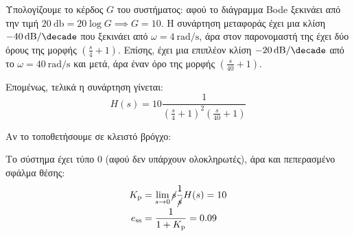 \documentclass[11pt,a4paper,notitlepage,fleqn]{article}
\begin{document}
\begin{exercise}
Υπολογίζουμε το κέρδος \( G \) του συστήματος: αφού το διάγραμμα Bode ξεκινάει από την τιμή
\( \SI{20}{\decibel} = 20\log G \implies G = 10 \). Η συνάρτηση μεταφοράς έχει μια κλίση
\( \SI{-40}{\decibel/\decade} \) που ξεκινάει από \( \omega = \SI{4}{\radian/\second} \),
άρα στον παρονομαστή της έχει δύο όρους της μορφής \( \left(\frac{s}{4}+1\right) \). Επίσης,
έχει μια επιπλέον κλίση \( \SI{-20}{\decibel/\decade} \) από το \( \omega = \SI{40}{\radian/\second} \) και μετά, άρα έναν όρο της μορφής \( \left(\frac{s}{40} + 1\right) \).

Επομένως, τελικά η συνάρτηση γίνεται:
\[
H(s) = 10 \frac{1}{\left(\frac{s}{4}+1\right)^2\left(\frac{s}{40}+1\right)}
\]

Αν το τοποθετήσουμε σε κλειστό βρόγχο:


Το σύστημα έχει τύπο 0 (αφού δεν υπάρχουν ολοκληρωτές), άρα και πεπερασμένο σφάλμα θέσης:
\begin{align*}
	K_{\mathrm{p}} &= \lim_{s\to 0} \cancel{s}\frac{1}{\cancel{s}}H(s) = 10 \\
	e_{\mathrm{ss}} &= \frac{1}{1+K_{\mathrm{p}}} = 0.09
\end{align*}

\end{exercise}
\end{document}
